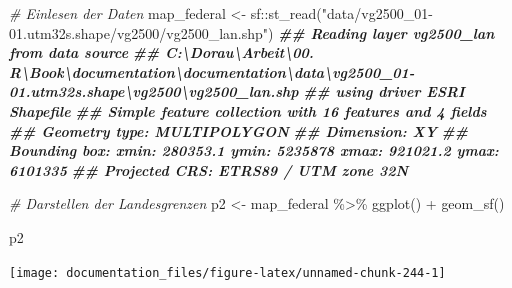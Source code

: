 \documentclass[
]{article}
\newenvironment{Shaded}{\begin{snugshade}}{\end{snugshade}}
\newcommand{\CommentTok}[1]{\textcolor[rgb]{0.56,0.35,0.01}{\textit{#1}}}
\newcommand{\DocumentationTok}[1]{\textcolor[rgb]{0.56,0.35,0.01}{\textbf{\textit{#1}}}}
\newcommand{\FunctionTok}[1]{\textcolor[rgb]{0.00,0.00,0.00}{#1}}
\newcommand{\NormalTok}[1]{#1}
\newcommand{\OtherTok}[1]{\textcolor[rgb]{0.56,0.35,0.01}{#1}}
\newcommand{\SpecialCharTok}[1]{\textcolor[rgb]{0.00,0.00,0.00}{#1}}
\newcommand{\StringTok}[1]{\textcolor[rgb]{0.31,0.60,0.02}{#1}}
\begin{document}
\begin{Shaded}
\begin{Highlighting}[]

\CommentTok{\# Einlesen der Daten}
\NormalTok{map\_federal }\OtherTok{\textless{}{-}}\NormalTok{ sf}\SpecialCharTok{::}\FunctionTok{st\_read}\NormalTok{(}\StringTok{"data/vg2500\_01{-}01.utm32s.shape/vg2500/vg2500\_lan.shp"}\NormalTok{)}
\DocumentationTok{\#\# Reading layer \textasciigrave{}vg2500\_lan\textquotesingle{} from data source }
\DocumentationTok{\#\#   \textasciigrave{}C:\textbackslash{}Dorau\textbackslash{}Arbeit\textbackslash{}00. R\textbackslash{}Book\textbackslash{}documentation\textbackslash{}documentation\textbackslash{}data\textbackslash{}vg2500\_01{-}01.utm32s.shape\textbackslash{}vg2500\textbackslash{}vg2500\_lan.shp\textquotesingle{} }
\DocumentationTok{\#\#   using driver \textasciigrave{}ESRI Shapefile\textquotesingle{}}
\DocumentationTok{\#\# Simple feature collection with 16 features and 4 fields}
\DocumentationTok{\#\# Geometry type: MULTIPOLYGON}
\DocumentationTok{\#\# Dimension:     XY}
\DocumentationTok{\#\# Bounding box:  xmin: 280353.1 ymin: 5235878 xmax: 921021.2 ymax: 6101335}
\DocumentationTok{\#\# Projected CRS: ETRS89 / UTM zone 32N}

\CommentTok{\# Darstellen der Landesgrenzen}
\NormalTok{p2 }\OtherTok{\textless{}{-}}\NormalTok{ map\_federal }\SpecialCharTok{\%\textgreater{}\%}
  \FunctionTok{ggplot}\NormalTok{() }\SpecialCharTok{+} 
  \FunctionTok{geom\_sf}\NormalTok{()}

\NormalTok{p2}
\end{Highlighting}
\end{Shaded}

\begin{center}\texttt{[image: documentation\_files/figure-latex/unnamed-chunk-244-1]} \end{center}
\end{document}

